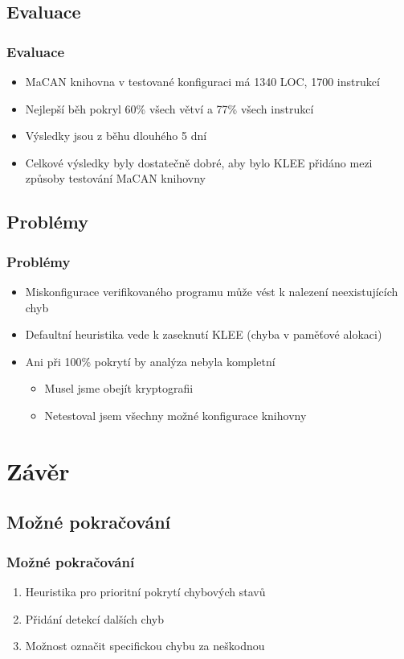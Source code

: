 \documentclass{beamer}
\begin{document}
\subsection*{Evaluace}
\begin{frame}
\frametitle{Evaluace}
\begin{itemize}
    \item MaCAN knihovna v testované konfiguraci má 1340 LOC, 1700 instrukcí
    \item Nejlepší běh pokryl 60\% všech větví a 77\% všech instrukcí
    \item Výsledky jsou z běhu dlouhého 5 dní
    \item Celkové výsledky byly dostatečně dobré, aby bylo KLEE přidáno mezi
    způsoby testování MaCAN knihovny
\end{itemize}
\end{frame}

\subsection*{Problémy}
\begin{frame}
\frametitle{Problémy}
\begin{itemize}
    \item Miskonfigurace verifikovaného programu může vést k nalezení neexistujících chyb
    \item Defaultní heuristika vede k zaseknutí KLEE (chyba v paměťové alokaci)
    \item Ani při 100\% pokrytí by analýza nebyla kompletní
    \begin{itemize}
        \item Musel jsme obejít kryptografii
        \item Netestoval jsem všechny možné konfigurace knihovny
    \end{itemize}
\end{itemize}
\end{frame}


\section{Závěr}
\subsection*{Možné pokračování}
\begin{frame}
\frametitle{Možné pokračování}
\begin{enumerate}
    \item Heuristika pro prioritní pokrytí chybových stavů
    \item Přidání detekcí dalších chyb
    \item Možnost označit specifickou chybu za neškodnou
\end{enumerate}
\end{frame}
\end{document}
